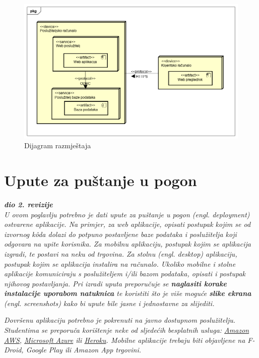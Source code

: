 		\begin{figure}[h]
			\centering
			\includegraphics[width=1\linewidth]{dijagrami/deployment_diagram}
			\caption{Dijagram razmještaja}
			\label{fig:deploymentdiagram}
		\end{figure}
			
			\eject 
		
		\section{Upute za puštanje u pogon}
		
			\textbf{\textit{dio 2. revizije}}\\
		
			 \textit{U ovom poglavlju potrebno je dati upute za puštanje u pogon (engl. deployment) ostvarene aplikacije. Na primjer, za web aplikacije, opisati postupak kojim se od izvornog kôda dolazi do potpuno postavljene baze podataka i poslužitelja koji odgovara na upite korisnika. Za mobilnu aplikaciju, postupak kojim se aplikacija izgradi, te postavi na neku od trgovina. Za stolnu (engl. desktop) aplikaciju, postupak kojim se aplikacija instalira na računalo. Ukoliko mobilne i stolne aplikacije komuniciraju s poslužiteljem i/ili bazom podataka, opisati i postupak njihovog postavljanja. Pri izradi uputa preporučuje se \textbf{naglasiti korake instalacije uporabom natuknica} te koristiti što je više moguće \textbf{slike ekrana} (engl. screenshots) kako bi upute bile jasne i jednostavne za slijediti.}
			
			
			 \textit{Dovršenu aplikaciju potrebno je pokrenuti na javno dostupnom poslužitelju. Studentima se preporuča korištenje neke od sljedećih besplatnih usluga: \href{https://aws.amazon.com/}{Amazon AWS}, \href{https://azure.microsoft.com/en-us/}{Microsoft Azure} ili \href{https://www.heroku.com/}{Heroku}. Mobilne aplikacije trebaju biti objavljene na F-Droid, Google Play ili Amazon App trgovini.}
			
			
			\eject 
